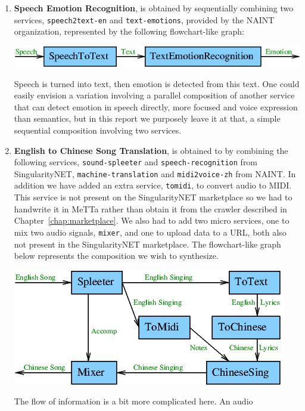 \documentclass[]{report}
\begin{document}
\begin{enumerate}
\item \textbf{Speech Emotion Recognition}, is obtained by sequentially
  combining two services, \texttt{speech2text-en} and
  \texttt{text-emotions}, provided by the NAINT organization,
  represented by the following flowchart-like graph:
  \begin{center}
    \includegraphics[scale=0.55]{figs/SimpleSpeechEmotionRecognition.png}
  \end{center}
  Speech is turned into text, then emotion is detected from this text.
  One could easily envision a variation involving a parallel
  composition of another service that can detect emotion in speech
  directly, more focused and voice expression than semantics, but in
  this report we purposely leave it at that, a simple sequential
  composition involving two services.
\item \textbf{English to Chinese Song Translation}, is obtained to by
  combining the following services, \texttt{sound-spleeter} and
  \texttt{speech-recognition} from SingularityNET,
  \texttt{machine-translation} and \texttt{midi2voice-zh} from NAINT.
  In addition we have added an extra service, \texttt{tomidi}, to
  convert audio to MIDI.  This service is not present on the
  SingularityNET marketplace so we had to handwrite it in MeTTa rather
  than obtain it from the crawler described in
  Chapter~\ref{chap:marketplace}.  We also had to add two micro
  services, one to mix two audio signals, \texttt{mixer}, and one to
  upload data to a URL, both also not present in the SingularityNET
  marketplace.  The flowchart-like graph below represents the
  composition we wish to synthesize.
  \begin{center}
    \includegraphics[scale=0.6]{figs/EnglishToChineseSong.png}
  \end{center}
  The flow of information is a bit more complicated here.  An audio

\end{enumerate}
\end{document}
